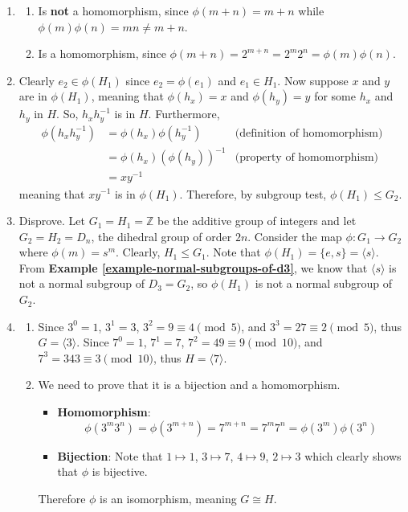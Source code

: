 \begin{enumerate}
    \item \begin{enumerate}[label=(\alph*)]
        \item Is \textbf{not} a homomorphism, since $\phi(m+n) = m + n$ while $\phi(m)\phi(n) = mn \neq m+n$.
        \item Is a homomorphism, since $\phi(m+n) = 2^{m+n} = 2^m2^n = \phi(m)\phi(n)$.
    \end{enumerate}

    \item Clearly $e_2 \in \phi(H_1)$ since $e_2 = \phi(e_1)$ and $e_1 \in H_1$. Now suppose $x$ and $y$ are in $\phi(H_1)$, meaning that $\phi(h_x) = x$ and $\phi(h_y) = y$ for some $h_x$ and $h_y$ in $H$. So, $h_xh_y^{-1}$ is in $H$. Furthermore,
    \begin{align*}
    \phi(h_xh_y^{-1}) &= \phi(h_x)\phi(h_y^{-1}) & \text{(definition of homomorphism)}\\
    &= \phi(h_x)\left(\phi(h_y)\right)^{-1} & \text{(property of homomorphism)}\\
    &= xy^{-1}
    \end{align*}
    meaning that $xy^{-1}$ is in $\phi(H_1)$. Therefore, by subgroup test, $\phi(H_1) \leq G_2$.

    \item Disprove. Let $G_1 = H_1 = \mathbb{Z}$ be the additive group of integers and let $G_2 = H_2 = D_n$, the dihedral group of order $2n$. Consider the map $\phi: G_1 \to G_2$ where $\phi(m) = s^m$. Clearly, $H_1 \leq G_1$. Note that $\phi(H_1) = \{e, s\} = \langle s \rangle$. From \textbf{Example \ref{example-normal-subgroups-of-d3}}, we know that $\langle s \rangle$ is not a normal subgroup of $D_3 = G_2$, so $\phi(H_1)$ is not a normal subgroup of $G_2$.

    \item \begin{enumerate}[label=(\roman*)]
        \item Since $3^0 = 1$, $3^1 = 3$, $3^2 = 9 \equiv 4 \pmod{5}$, and $3^3 = 27 \equiv 2 \pmod{5}$, thus $G = \langle 3 \rangle$. Since $7^0 = 1$, $7^1 = 7$, $7^2 = 49 \equiv 9 \pmod{10}$, and $7^3 = 343 \equiv 3 \pmod{10}$, thus $H = \langle 7 \rangle$.
        \item We need to prove that it is a bijection and a homomorphism.
        \begin{itemize}
            \item \textbf{Homomorphism}:
            \[
                \phi(3^m3^n) = \phi(3^{m+n}) = 7^{m+n} = 7^m7^n = \phi(3^m)\phi(3^n)
            \]
            \item \textbf{Bijection}: Note that $1 \mapsto 1$, $3 \mapsto 7$, $4 \mapsto 9$, $2 \mapsto 3$ which clearly shows that $\phi$ is bijective.
        \end{itemize}
        Therefore $\phi$ is an isomorphism, meaning $G \cong H$.
    \end{enumerate}


\end{enumerate}
